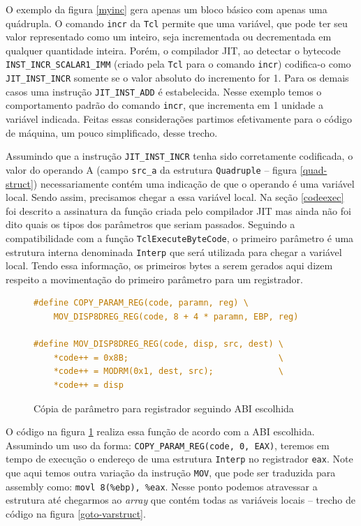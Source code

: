 O exemplo da figura \ref{myinc} gera apenas um bloco básico com
apenas uma quádrupla. O comando \verb!incr! da \texttt{Tcl} permite
que uma variável, que pode ter seu valor representado como um inteiro,
seja incrementada ou decrementada em qualquer quantidade inteira.
Porém, o compilador
JIT, ao detectar o bytecode \verb!INST_INCR_SCALAR1_IMM! (criado pela
\texttt{Tcl} para o comando \verb!incr!) codifica-o
como \verb!JIT_INST_INCR! somente se o valor absoluto do incremento
for 1. Para os demais casos uma instrução \verb!JIT_INST_ADD! é estabelecida.
Nesse exemplo temos o comportamento padrão do comando \verb!incr!, que
incrementa em 1 unidade a variável indicada. Feitas essas
considerações partimos efetivamente para o código de máquina, um pouco
simplificado, desse trecho.

Assumindo que a instrução \verb!JIT_INST_INCR! tenha sido corretamente
codificada, o valor do operando A (campo \verb!src_a! da estrutura
\verb!Quadruple! -- figura \ref{quad-struct}) necessariamente contém uma
indicação de que o operando é uma variável local. Sendo assim,
precisamos chegar a essa variável local. Na seção \ref{codeexec} foi
descrito a assinatura da função criada pelo compilador JIT mas ainda
não foi dito quais os tipos dos parâmetros que seriam
passados. Seguindo a compatibilidade com a função
\verb!TclExecuteByteCode!, o primeiro parâmetro é uma estrutura
interna denominada \verb!Interp! que será utilizada para chegar a
variável local. Tendo essa informação, os primeiros bytes a serem
gerados aqui dizem respeito a movimentação do primeiro parâmetro para
um registrador.
\begin{figure}[h]
  \centering
  \begin{lstlisting}[language=C]
#define COPY_PARAM_REG(code, paramn, reg) \
    MOV_DISP8DREG_REG(code, 8 + 4 * paramn, EBP, reg)

#define MOV_DISP8DREG_REG(code, disp, src, dest) \
    *code++ = 0x8B;                              \
    *code++ = MODRM(0x1, dest, src);             \
    *code++ = disp
  \end{lstlisting}
  \caption{Cópia de parâmetro para registrador seguindo ABI escolhida\label{copy-param}}
\end{figure}
O código na figura \ref{copy-param} realiza essa
função de acordo com a ABI escolhida. Assumindo um uso da forma:
\verb!COPY_PARAM_REG(code, 0, EAX)!, teremos em tempo de execução o
endereço de uma estrutura \verb!Interp! no registrador
\verb!eax!. Note que aqui temos outra variação da instrução
\verb!MOV!, que pode ser traduzida para assembly como:
\verb!movl 8(%ebp), %eax!. Nesse ponto podemos atravessar a estrutura até
chegarmos ao \textit{array} que contém todas as variáveis locais --
trecho de código na figura \ref{goto-varstruct}.

